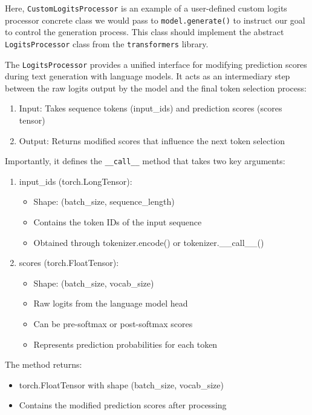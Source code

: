 Here, \texttt{CustomLogitsProcessor} is an example of a user-defined custom logits processor concrete class we would pass to \texttt{model.generate()} to instruct our goal to control the generation process. This class should implement the abstract \texttt{LogitsProcessor} class from the \texttt{transformers} library.

The \texttt{LogitsProcessor} provides a unified interface for modifying prediction scores during text generation with language models. It acts as an intermediary step between the raw logits output by the model and the final token selection process:

\begin{enumerate}
    \item Input: Takes sequence tokens (input\_ids) and prediction scores (scores tensor)
    \item Output: Returns modified scores that influence the next token selection
\end{enumerate}

Importantly, it defines the \texttt{\_\_call\_\_} method that takes two key arguments:

\begin{enumerate}
    \item input\_ids (torch.LongTensor): 
    \begin{itemize}
        \item Shape: (batch\_size, sequence\_length)
        \item Contains the token IDs of the input sequence
        \item Obtained through tokenizer.encode() or tokenizer.\_\_call\_\_()
    \end{itemize}
    
    \item scores (torch.FloatTensor):
    \begin{itemize}
        \item Shape: (batch\_size, vocab\_size) 
        \item Raw logits from the language model head
        \item Can be pre-softmax or post-softmax scores
        \item Represents prediction probabilities for each token
    \end{itemize}
\end{enumerate}

The method returns:
\begin{itemize}
    \item torch.FloatTensor with shape (batch\_size, vocab\_size)
    \item Contains the modified prediction scores after processing
\end{itemize}

